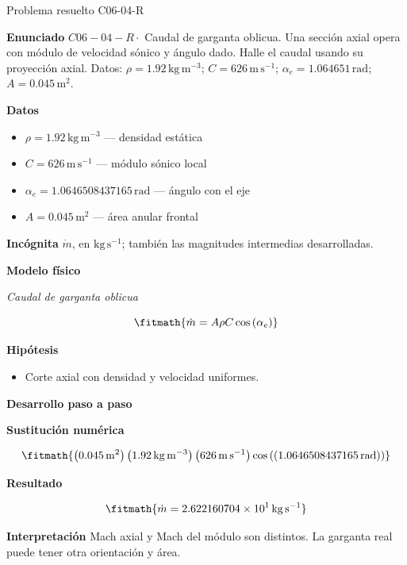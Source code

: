 \documentclass[10pt,openany]{book}
\begin{document}
\begin{studiumworked}{Problema resuelto C06-04-R}


\noindent\textbf{Enunciado}
\(C06-04-R \cdot\) Caudal de garganta oblicua. Una sección axial opera con módulo de velocidad sónico y ángulo dado. Halle el caudal usando su proyección axial. Datos: \(\rho=1.92\, \mathrm{kg}\,\mathrm{m}^{-3}\); \(C=626\, \mathrm{m}\,\mathrm{s}^{-1}\); \(\alpha_e=1.064651\, \mathrm{rad}\); \(A=0.045\, \mathrm{m}^{2}\).

\noindent\textbf{Datos}
\begin{itemize}
\item $\rho = 1.92\,\mathrm{kg}\,\mathrm{m}^{-3}$ — densidad estática
\item $C = 626\,\mathrm{m}\,\mathrm{s}^{-1}$ — módulo sónico local
\item $\alpha_e = 1.0646508437165\,\mathrm{rad}$ — ángulo con el eje
\item $A = 0.045\,\mathrm{m}^{2}$ — área anular frontal
\end{itemize}

\noindent\textbf{Incógnita}
$\dot{m}$, en $\mathrm{kg\,s^{-1}}$; también las magnitudes intermedias desarrolladas.

\noindent\textbf{Modelo físico}

\noindent\textit{Caudal de garganta oblicua}

\[
\fitmath{\dot m=A \rho C \cos{\left(\alpha_e \right)}}
\]

\noindent\textbf{Hipótesis}
\begin{itemize}
\item Corte axial con densidad y velocidad uniformes.
\end{itemize}

\noindent\textbf{Desarrollo paso a paso}



\noindent\textbf{Sustitución numérica}

\[
\fitmath{\left(0.045\,\mathrm{m}^{2}\right) \left(1.92\,\mathrm{kg}\,\mathrm{m}^{-3}\right) \left(626\,\mathrm{m}\,\mathrm{s}^{-1}\right) \cos{\left(\left(1.0646508437165\,\mathrm{rad}\right) \right)}}
\]

\noindent\textbf{Resultado}

\[
\fitmath{\dot m=2.622160704\times10^{1}\,\mathrm{kg}\,\mathrm{s}^{-1}}
\]

\noindent\textbf{Interpretación}
Mach axial y Mach del módulo son distintos. La garganta real puede tener otra orientación y área.


\end{studiumworked}
\end{document}
